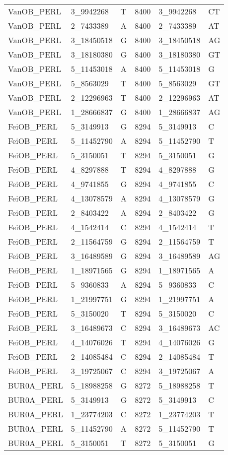 \begin{center}
\begin{longtable}{|l|l|l|l|l|l|}
VanOB\_PERL&3\_9942268&T&8400&3\_9942268&CT\\
VanOB\_PERL&2\_7433389&A&8400&2\_7433389&AT\\
VanOB\_PERL&3\_18450518&G&8400&3\_18450518&AG\\
VanOB\_PERL&3\_18180380&G&8400&3\_18180380&GT\\
VanOB\_PERL&5\_11453018&A&8400&5\_11453018&G\\
VanOB\_PERL&5\_8563029&T&8400&5\_8563029&GT\\
VanOB\_PERL&2\_12296963&T&8400&2\_12296963&AT\\
VanOB\_PERL&1\_28666837&G&8400&1\_28666837&AG\\
FeiOB\_PERL&5\_3149913&G&8294&5\_3149913&C\\
FeiOB\_PERL&5\_11452790&A&8294&5\_11452790&T\\
FeiOB\_PERL&5\_3150051&T&8294&5\_3150051&G\\
FeiOB\_PERL&4\_8297888&T&8294&4\_8297888&G\\
FeiOB\_PERL&4\_9741855&G&8294&4\_9741855&C\\
FeiOB\_PERL&4\_13078579&A&8294&4\_13078579&G\\
FeiOB\_PERL&2\_8403422&A&8294&2\_8403422&G\\
FeiOB\_PERL&4\_1542414&C&8294&4\_1542414&T\\
FeiOB\_PERL&2\_11564759&G&8294&2\_11564759&T\\
FeiOB\_PERL&3\_16489589&G&8294&3\_16489589&AG\\
FeiOB\_PERL&1\_18971565&G&8294&1\_18971565&A\\
FeiOB\_PERL&5\_9360833&A&8294&5\_9360833&C\\
FeiOB\_PERL&1\_21997751&G&8294&1\_21997751&A\\
FeiOB\_PERL&5\_3150020&T&8294&5\_3150020&C\\
FeiOB\_PERL&3\_16489673&C&8294&3\_16489673&AC\\
FeiOB\_PERL&4\_14076026&T&8294&4\_14076026&G\\
FeiOB\_PERL&2\_14085484&C&8294&2\_14085484&T\\
FeiOB\_PERL&3\_19725067&C&8294&3\_19725067&A\\
BUR0A\_PERL&5\_18988258&G&8272&5\_18988258&T\\
BUR0A\_PERL&5\_3149913&G&8272&5\_3149913&C\\
BUR0A\_PERL&1\_23774203&C&8272&1\_23774203&T\\
BUR0A\_PERL&5\_11452790&A&8272&5\_11452790&T\\
BUR0A\_PERL&5\_3150051&T&8272&5\_3150051&G\\

\end{longtable}
\end{center}
